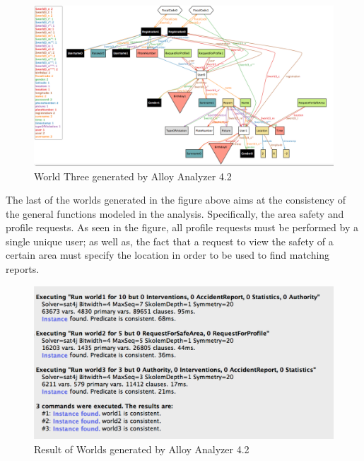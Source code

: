 	\begin{figure}[H]	
		\centering
		\includegraphics[scale=0.35]{images/World3.png}
		\caption{World Three generated by Alloy Analyzer 4.2}
	\end{figure}
	
The last of the worlds generated in the figure above aims at the consistency of the general functions modeled in the analysis. Specifically, the area safety and profile requests. As seen in the figure, all profile requests must be performed by a single unique user; as well as, the fact that a request to view the safety of a certain area must specify the location in order to be used to find matching reports.


	\begin{figure}[H]	
		\centering
		\includegraphics[scale=0.35]{images/Result.png}
		\caption{Result of Worlds generated by Alloy Analyzer 4.2}
	\end{figure}
